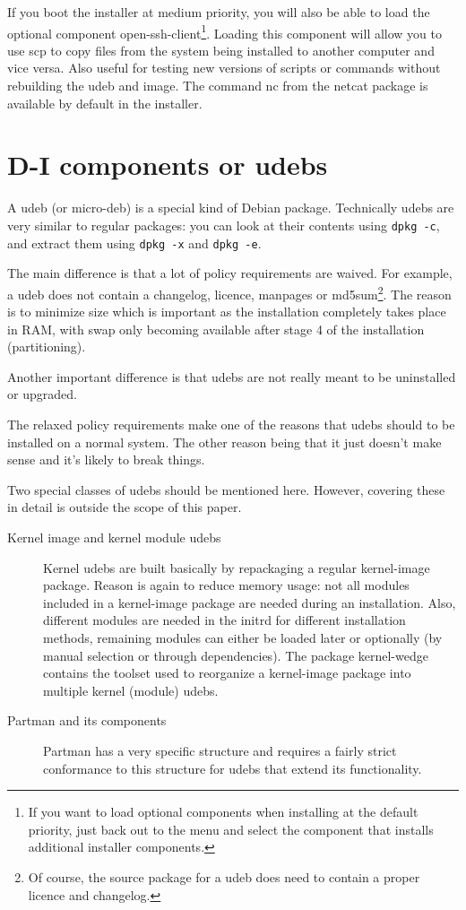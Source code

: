 \documentclass[a4paper,10pt]{article}
\begin{document}
If you boot the installer at medium priority, you will also be able to load the optional component open-ssh-client\footnote{If you want to load optional components when installing at the default priority, just back out to the menu and select the component that installs additional installer components.}. Loading this component will allow you to use scp to copy files from the system being installed to another computer and vice versa. Also useful for testing new versions of scripts or commands without rebuilding the udeb and image. The command nc from the netcat package is available by default in the installer. 

\section{D-I components or udebs}
A udeb (or micro-deb) is a special kind of Debian package. Technically udebs are very similar to regular packages: you can look at their contents using \texttt{dpkg -c}, and extract them using \texttt{dpkg -x} and \texttt{dpkg -e}. 

The main difference is that a lot of policy requirements are waived. For example, a udeb does not contain a changelog, licence, manpages or md5sum\footnote{Of course, the source package for a udeb does need to contain a proper licence and changelog.}. The reason is to minimize size which is important as the installation completely takes place in RAM, with swap only becoming available after stage 4 of the installation (partitioning). 

Another important difference is that udebs are not really meant to be uninstalled or upgraded. 

The relaxed policy requirements make one of the reasons that udebs should to be installed on a normal system. The other reason being that it just doesn't make sense and it's likely to break things. 

Two special classes of udebs should be mentioned here. However, covering these in detail is outside the scope of this paper. 

\begin{description}
\item[Kernel image and kernel module udebs]
Kernel udebs are built basically by repackaging a regular kernel-image package. Reason is again to reduce memory usage: not all modules included in a kernel-image package are needed during an installation. Also, different modules are needed in the initrd for different installation methods, remaining modules can either be loaded later or optionally (by manual selection or through dependencies). The package kernel-wedge contains the toolset used to reorganize a kernel-image package into multiple kernel (module) udebs. 
\item[Partman and its components]
Partman has a very specific structure and requires a fairly strict conformance to this structure for udebs that extend its functionality. 
\end{description}
\end{document}
